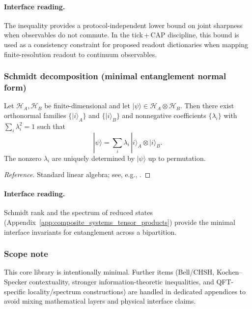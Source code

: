 \paragraph{Interface reading.}
\InterfaceTag The inequality provides a protocol-independent lower bound on joint sharpness when observables do not commute.
In the tick\,+\,CAP discipline, this bound is used as a consistency constraint for proposed readout dictionaries when mapping finite-resolution readout to continuum observables.

\subsubsection{Schmidt decomposition (minimal entanglement normal form)}
\begin{theorem}
\label{thm:z128_schmidt}
Let $\mathcal{H}_A,\mathcal{H}_B$ be finite-dimensional and let $|\psi\rangle\in\mathcal{H}_A\otimes\mathcal{H}_B$.
Then there exist orthonormal families $\{|i\rangle_A\}$ and $\{|i\rangle_B\}$ and nonnegative coefficients $\{\lambda_i\}$ with $\sum_i \lambda_i^2=1$ such that
\[
|\psi\rangle=\sum_i \lambda_i\,|i\rangle_A\otimes |i\rangle_B.
\]
The nonzero $\lambda_i$ are uniquely determined by $|\psi\rangle$ up to permutation.
\end{theorem}
\begin{proof}[Reference]
Standard linear algebra; see, e.g., \cite{NielsenChuang2000}.
\end{proof}

\paragraph{Interface reading.}
\InterfaceTag Schmidt rank and the spectrum of reduced states (Appendix~\ref{app:composite_systems_tensor_products}) provide the minimal interface invariants for entanglement across a bipartition.

\subsubsection{Scope note}
\AuditTag This core library is intentionally minimal.
Further items (Bell/CHSH, Kochen--Specker contextuality, stronger information-theoretic inequalities, and QFT-specific locality/spectrum constructions) are handled in dedicated appendices to avoid mixing mathematical layers and physical interface claims.

